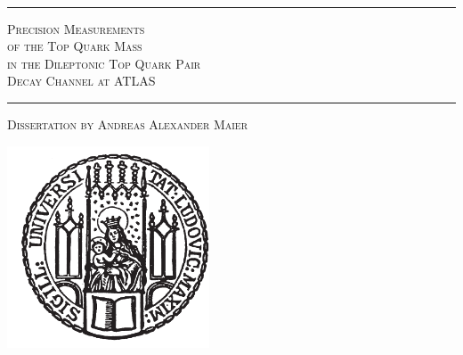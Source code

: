 
\thispagestyle{empty}
\begin{center}
~
\vspace{2.5cm}
\hfill \rule{\textwidth}{1pt}
\vspace{1.1cm}

\textsc{\Huge Precision Measurements\\ }
\vspace{0.8cm}
\textsc{\Huge of the Top Quark Mass\\}
\vspace{0.8cm}
\textsc{\Huge in the Dileptonic Top Quark Pair\\}
\vspace{0.8cm}
\textsc{\Huge Decay Channel at ATLAS\\}
\vspace{1.6cm}

\hfill \rule{\textwidth}{1pt}

\vspace{0.4cm}

\textsc{\Large \hfill Dissertation by Andreas Alexander Maier}

\vfill

\hfill
\begin{minipage}[]{5.5cm}
\begin{center}
\includegraphics[height=6cm]{./logos/lmu_siegel.pdf}
\end{center}
\end{minipage}


\end{center}


\clearpage{\pagestyle{empty}\cleardoublepage}


